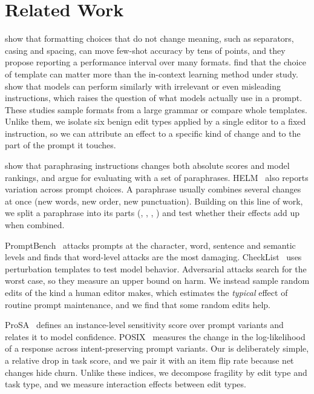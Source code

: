 \section{Related Work}
\label{sec:related}

\citet{sclar2024quantifying} show that formatting choices that do not change meaning, such as separators, casing and spacing, can move few-shot accuracy by tens of points, and they propose reporting a performance interval over many formats. \citet{voronov2024mind} find that the choice of template can matter more than the in-context learning method under study. \citet{webson2022prompt} show that models can perform similarly with irrelevant or even misleading instructions, which raises the question of what models actually use in a prompt. These studies sample formats from a large grammar or compare whole templates. Unlike them, we isolate six benign edit types applied by a single editor to a fixed instruction, so we can attribute an effect to a specific kind of change and to the part of the prompt it touches.

\citet{mizrahi2024state} show that paraphrasing instructions changes both absolute scores and model rankings, and argue for evaluating with a set of paraphrases. HELM~\citep{liang2023helm} also reports variation across prompt choices. A paraphrase usually combines several changes at once (new words, new order, new punctuation). Building on this line of work, we split a paraphrase into its parts (\syn, \reord, \punct, \caps) and test whether their effects add up when combined.

PromptBench~\citep{zhu2023promptbench} attacks prompts at the character, word, sentence and semantic levels and finds that word-level attacks are the most damaging. CheckList~\citep{ribeiro2020checklist} uses perturbation templates to test model behavior. Adversarial attacks search for the worst case, so they measure an upper bound on harm. We instead sample random edits of the kind a human editor makes, which estimates the \emph{typical} effect of routine prompt maintenance, and we find that some random edits help.

ProSA~\citep{zhuo2024prosa} defines an instance-level sensitivity score over prompt variants and relates it to model confidence. POSIX~\citep{chatterjee2024posix} measures the change in the log-likelihood of a response across intent-preserving prompt variants. Our \pfi is deliberately simple, a relative drop in task score, and we pair it with an item flip rate because net changes hide churn. Unlike these indices, we decompose fragility by edit type and task type, and we measure interaction effects between edit types.

